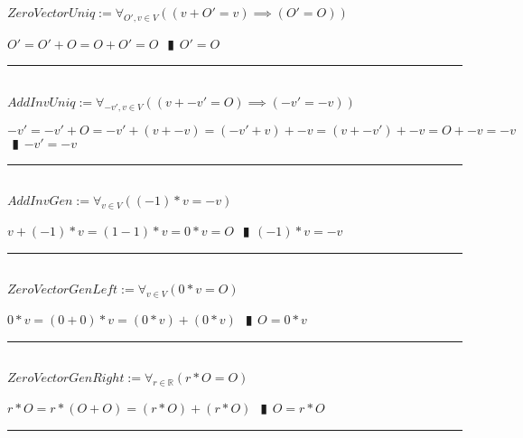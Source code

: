 \documentclass{book}
\newcommand{\abr}{:=}
\newcommand{\pipe}{$\phantom{(}\vrectangleblack\phantom{)}$}
\begin{document}
$ZeroVectorUniq \abr \forall_{O', v \in V}((v + O' = v) \implies (O' = O))$
\begin{enumerate}
  \lit $O' = O' + O = O + O' = O$ \pipe $O' = O$
\end{enumerate} \vspace{.75mm} \hrule \vspace{.75mm} \ \\ 

$AddInvUniq \abr \forall_{-v', v \in V}((v + -v' = O) \implies (-v' = -v))$
\begin{enumerate}
  \lit $-v' = -v' + O = -v' + (v + -v) = (-v' + v) + -v = (v + -v') + -v = O + -v = -v$ \pipe $-v' = -v$
\end{enumerate} \vspace{.75mm} \hrule \vspace{.75mm} \ \\ 

$AddInvGen \abr \forall_{v \in V}((-1) * v = -v)$
\begin{enumerate}
  \lit $v + (-1) * v = (1 - 1) * v = 0 * v = O$ \pipe $(-1) * v = -v$
\end{enumerate} \vspace{.75mm} \hrule \vspace{.75mm} \ \\ 

$ZeroVectorGenLeft \abr \forall_{v \in V}(0 * v = O)$
\begin{enumerate}
  \lit $0 * v = (0 + 0) * v = (0 * v) + (0 * v)$ \pipe $O = 0 * v$
\end{enumerate} \vspace{.75mm} \hrule \vspace{.75mm} \ \\ 

$ZeroVectorGenRight \abr \forall_{r \in \mathbb{R}}(r * O = O)$
\begin{enumerate}
  \lit $r * O = r * (O + O) = (r * O) + (r * O)$ \pipe $O = r * O$
\end{enumerate} \vspace{.75mm} \hrule \vspace{.75mm} \ \\ 
\end{document}
